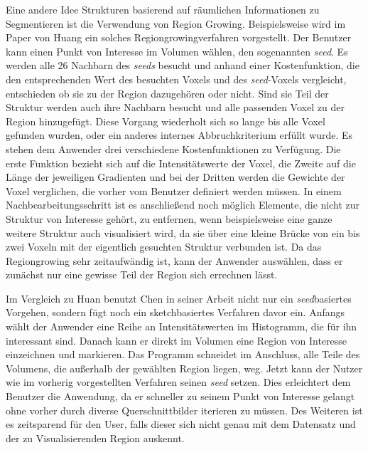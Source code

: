 Eine andere Idee Strukturen basierend auf räumlichen Informationen zu Segmentieren ist die Verwendung von Region Growing.
\newline
Beispielsweise wird im Paper von Huang \cite{huang2003rgvis} ein solches Regiongrowingverfahren vorgestellt. Der Benutzer kann einen Punkt von Interesse im Volumen wählen, den sogenannten \textit{seed}. Es werden alle 26 Nachbarn des \textit{seeds} besucht und anhand einer Kostenfunktion, die den entsprechenden Wert des besuchten Voxels und des \textit{seed}-Voxels vergleicht, entschieden ob sie zu der Region dazugehören oder nicht. Sind sie Teil der Struktur werden auch ihre Nachbarn besucht und alle passenden Voxel zu der Region hinzugefügt. Diese Vorgang wiederholt sich so lange bis alle Voxel gefunden wurden, oder ein anderes internes Abbruchkriterium erfüllt wurde.
\newline
Es stehen dem Anwender drei verschiedene Kostenfunktionen zu Verfügung. Die erste Funktion bezieht sich auf die Intensitätswerte der Voxel, die Zweite auf die Länge der jeweiligen Gradienten und bei der Dritten werden die Gewichte der Voxel verglichen, die vorher vom Benutzer definiert werden müssen.
\newline
In einem Nachbearbeitungsschritt ist es anschließend noch möglich Elemente, die nicht zur Struktur von Interesse gehört, zu entfernen, wenn beispielsweise eine ganze weitere Struktur auch visualisiert wird, da sie über eine kleine Brücke von ein bis zwei Voxeln mit der eigentlich gesuchten Struktur verbunden ist.
\newline
Da das Regiongrowing sehr zeitaufwändig ist, kann der Anwender auswählen, dass er zunächst nur eine gewisse Teil der Region sich errechnen lässt.


Im Vergleich zu Huan \cite{huang2003rgvis} benutzt Chen  in seiner Arbeit \cite{chen2006sketch} nicht nur ein \textit{seed}basiertes Vorgehen, sondern fügt noch ein sketchbasiertes Verfahren davor ein.
\newline
Anfangs wählt der Anwender eine Reihe an Intensitätswerten im Histogramm, die für ihn interessant sind. Danach kann er direkt im Volumen eine Region von Interesse einzeichnen und markieren. Das Programm schneidet im Anschluss, alle Teile des Volumens, die außerhalb der gewählten Region liegen, weg. Jetzt kann der Nutzer wie im vorherig vorgestellten Verfahren seinen \textit{seed} setzen.
\newline
Dies erleichtert dem Benutzer die Anwendung, da er schneller zu seinem Punkt von Interesse gelangt ohne vorher durch diverse Querschnittbilder iterieren zu müssen. Des Weiteren ist es zeitsparend für den User, falls dieser sich nicht genau mit dem Datensatz und der zu Visualisierenden Region auskennt.


